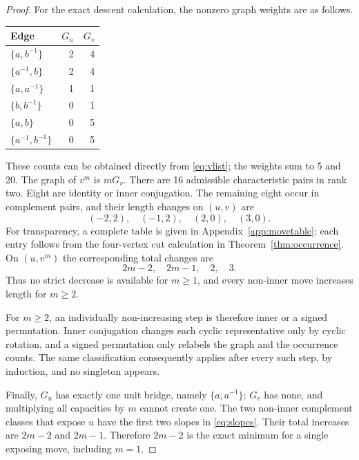 \documentclass[11pt,letterpaper]{article}
\theoremstyle{definition}\newtheorem{definition}[theorem]{Definition}
\newcommand{\set}[1]{\{#1\}}
\begin{document}
\begin{proof}
For the exact descent calculation, the nonzero graph weights are as follows.
\begin{center}
\begin{tabular}{lrr}
\toprule Edge & $G_u$ & $G_v$\\\midrule
$\set{a,b^{-1}}$ & 2 & 4\\
$\set{a^{-1},b}$ & 2 & 4\\
$\set{a,a^{-1}}$ & 1 & 1\\
$\set{b,b^{-1}}$ & 0 & 1\\
$\set{a,b}$ & 0 & 5\\
$\set{a^{-1},b^{-1}}$ & 0 & 5\\\bottomrule
\end{tabular}
\end{center}
These counts can be obtained directly from \eqref{eq:vlist}; the weights sum to 5 and 20. The graph of $v^m$ is $mG_v$. There are 16 admissible characteristic pairs in rank two. Eight are identity or inner conjugation. The remaining eight occur in complement pairs, and their length changes on $(u,v)$ are
\begin{equation}\label{eq:slopes}
 (-2,2),\quad(-1,2),\quad(2,0),\quad(3,0).
\end{equation}
For transparency, a complete table is given in Appendix~\ref{app:movetable}; each entry follows from the four-vertex cut calculation in Theorem~\ref{thm:occurrence}. On $(u,v^m)$ the corresponding total changes are
\begin{equation}\label{eq:barrierdeltas}
 2m-2,\quad2m-1,\quad2,\quad3.
\end{equation}
Thus no strict decrease is available for $m\ge1$, and every non-inner move increases length for $m\ge2$.

For $m\ge2$, an individually non-increasing step is therefore inner or a signed permutation. Inner conjugation changes each cyclic representative only by cyclic rotation, and a signed permutation only relabels the graph and the occurrence counts. The same classification consequently applies after every such step, by induction, and no singleton appears.

Finally, $G_u$ has exactly one unit bridge, namely $\set{a,a^{-1}}$; $G_v$ has none, and multiplying all capacities by $m$ cannot create one. The two non-inner complement classes that expose $u$ have the first two slopes in \eqref{eq:slopes}. Their total increases are $2m-2$ and $2m-1$. Therefore $2m-2$ is the exact minimum for a single exposing move, including $m=1$.
\end{proof}
\end{document}
